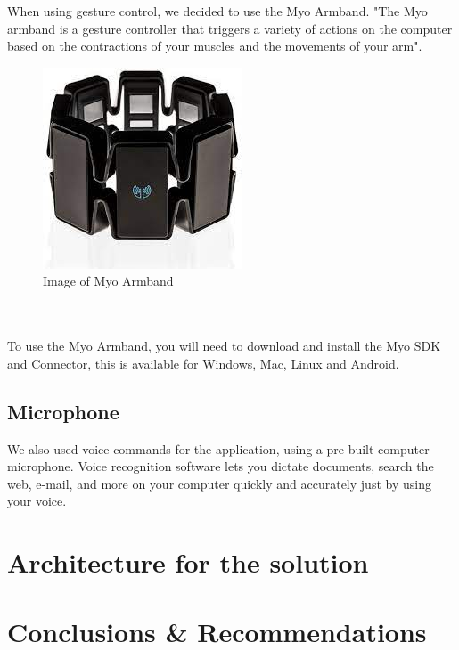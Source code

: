 \documentclass{article}
\begin{document}
When using gesture control, we decided to use the Myo Armband. "The Myo armband is a gesture controller that triggers a variety of actions on the computer based on the contractions of your muscles and the movements of your arm".
\begin{figure}[h]
    \includegraphics[scale=0.6]{img/myoarmband2.jpg}
    \centering
    \caption{Image of Myo Armband}
    \label{fig: A Picture of the Myo Armband}
\end{figure}
\\ \\
To use the Myo Armband, you will need to download and install the Myo SDK and Connector, this is available for Windows, Mac, Linux and Android.

\subsection{Microphone}

We also used voice commands for the application, using a pre-built computer microphone. Voice recognition software lets you dictate documents, search the web, e-mail, and more on your computer quickly and accurately just by using your voice.

\section{Architecture for the solution}

\section{Conclusions \& Recommendations}
\end{document}
